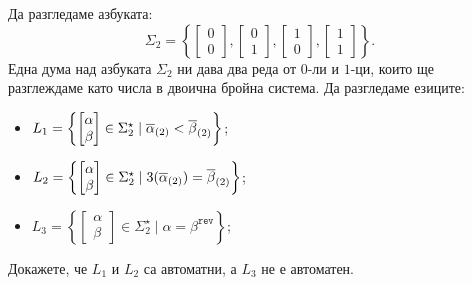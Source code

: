 \begin{problem}
  Да разгледаме азбуката:
  \[\Sigma_2 = \left\{\begin{bmatrix} 0\\0\end{bmatrix},\begin{bmatrix} 0\\1\end{bmatrix},\begin{bmatrix} 1\\0\end{bmatrix},\begin{bmatrix} 1\\1\end{bmatrix}\right\}.\]
  Една дума над азбуката $\Sigma_2$ ни дава два реда от $0$-ли и $1$-ци, които ще разглеждаме като числа в двоична бройна система.
  Да разгледаме езиците:
  \begin{itemize}
  \item 
    $L_1 = \left\{\begin{bmatrix} \alpha\\ \beta \end{bmatrix} \in \Sigma^\star_2 \mid \overline{\alpha}_{(2)} < \overline{\beta}_{(2)}\right\}$;
  \item
    $L_2 = \left\{\begin{bmatrix} \alpha\\ \beta \end{bmatrix} \in \Sigma^\star_2 \mid 3(\overline{\alpha}_{(2)}) = \overline{\beta}_{(2)}\right\}$;
  \item
    $L_3 = \left\{\begin{bmatrix} \alpha\\ \beta \end{bmatrix} \in \Sigma^\star_2 \mid \alpha = \beta^{\texttt{rev}}\right\}$;
  \end{itemize}
  Докажете, че  $L_1$ и $L_2$ са автоматни, а $L_3$ не е автоматен.
\end{problem}
\ifhints
